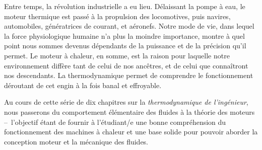 Entre temps, la révolution industrielle a eu lieu. Délaissant la pompe à eau, le moteur thermique est passé à la propulsion des locomotives, puis navires, automobiles, génératrices de courant, et aéronefs. Notre mode de vie, dans lequel la force physiologique humaine n’a plus la moin\-dre importance, montre à quel point  nous som\-mes devenus dépendants de la puissance et de la précision qu’il permet. Le moteur à chaleur, en somme, est la raison pour laquelle notre environnement diffère tant de celui de nos ancêtres, et de celui que connaîtront nos descendants. La thermodynamique permet de comprendre le fonctionnement déroutant de cet engin à la fois banal et effroyable.

Au cours de cette série de dix chapitres sur la \textit{thermodynamique de l’ingénieur}, nous passerons du comportement élémentaire des fluides à la théorie des moteurs –\ l’objectif étant de fournir à l’étudiant/e une bonne compréhension du fonctionnement des machines à chaleur et une base solide pour pouvoir aborder la conception moteur et la mécanique des fluides.

